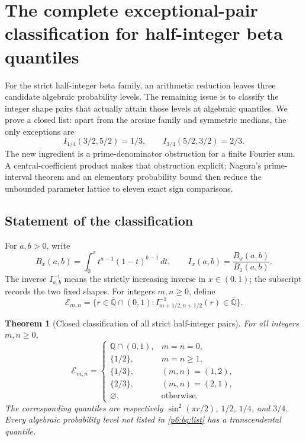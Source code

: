 \documentclass[11pt,a4paper]{article}
\newtheorem{theorem}{Theorem}[section]
\theoremstyle{definition}
\theoremstyle{remark}
\numberwithin{equation}{section}
\begin{document}
\clearpage

\section{The complete exceptional-pair classification for half-integer beta quantiles}
\label{p6:bq:section}

For the strict half-integer beta family, an arithmetic reduction leaves
three candidate algebraic probability levels. The remaining issue is to
classify the integer shape pairs that actually attain those levels at
algebraic quantiles. We prove a closed list: apart from the arcsine family
and symmetric medians, the only exceptions are
\[
 I_{1/4}(3/2,5/2)=1/3,\qquad I_{3/4}(5/2,3/2)=2/3.
\]
The new ingredient is a prime-denominator obstruction for a finite Fourier
sum. A central-coefficient product makes that obstruction explicit;
Nagura's prime-interval theorem and an elementary probability bound then
reduce the unbounded parameter lattice to eleven exact sign comparisons.

\subsection{Statement of the classification}

For $a,b>0$, write
\[
 B_x(a,b)=\int_0^x t^{a-1}(1-t)^{b-1}\,dt,
 \qquad I_x(a,b)=\frac{B_x(a,b)}{B_1(a,b)}.
\]
The inverse $I^{-1}_{a,b}$ means the strictly increasing inverse in
$x\in(0,1)$; the subscript records the two fixed shapes. For integers
$m,n\ge0$, define
\[
 \mathcal E_{m,n}
 =\{r\in\overline{\mathbb Q}\cap(0,1):
          I^{-1}_{m+1/2,n+1/2}(r)\in\overline{\mathbb Q}\}.
\]

\begin{theorem}[Closed classification of all strict half-integer pairs]
\label{p6:bq:classification}
For all integers $m,n\ge0$,
\begin{equation}\label{p6:bq:list}
 \mathcal E_{m,n}=
 \begin{cases}
  \mathbb Q\cap(0,1),&m=n=0,\\
  \{1/2\},&m=n\ge1,\\
  \{1/3\},&(m,n)=(1,2),\\
  \{2/3\},&(m,n)=(2,1),\\
  \varnothing,&\text{otherwise}.
 \end{cases}
\end{equation}
The corresponding quantiles are respectively
$\sin^2(\pi r/2)$, $1/2$, $1/4$, and $3/4$.
Every algebraic probability level not listed in
\eqref{p6:bq:list} has a transcendental quantile.
\end{theorem}
\end{document}

